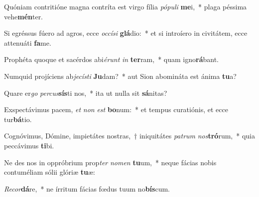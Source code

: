 \item Quóniam contritióne magna contríta est virgo fília \textit{pó}\textit{pu}\textit{li} \textbf{me}i,~* plaga péssima vehe\textbf{mén}ter.
\item Si egréssus fúero ad agros, ecce \textit{oc}\textit{cí}\textit{si} \textbf{glá}dio:~* et si introíero in civitátem, ecce attenuáti \textbf{fa}me.
\item Prophéta quoque et sacérdos abi\textit{é}\textit{runt} \textit{in} \textbf{ter}ram,~* quam igno\textbf{rá}bant.
\item Numquid projíciens ab\textit{je}\textit{cís}\textit{ti} \textbf{Ju}dam?~* aut Sion abomináta est ánima \textbf{tu}a?
\item Quare er\textit{go} \textit{per}\textit{cus}\textbf{sís}ti nos,~* ita ut nulla sit \textbf{sá}nitas?
\item Exspectávimus pacem, \textit{et} \textit{non} \textit{est} \textbf{bo}num:~* et tempus curatiónis, et ecce tur\textbf{bá}tio.
\item Cognóvimus, Dómine, impietátes nostras,~† iniquitátes \textit{pa}\textit{trum} \textit{nos}\textbf{tró}rum,~* quia peccávimus \textbf{ti}bi.
\item Ne des nos in oppróbrium prop\textit{ter} \textit{no}\textit{men} \textbf{tu}um,~* neque fácias nobis contuméliam sólii glóriæ \textbf{tu}æ:
\item \textit{Re}\textit{cor}\textbf{dá}re,~* ne írritum fácias fœdus tuum no\textbf{bís}cum.
